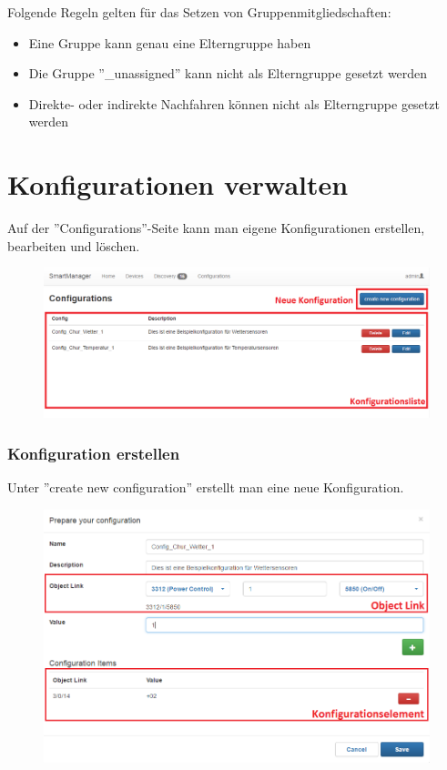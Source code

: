 Folgende Regeln gelten für das Setzen von Gruppenmitgliedschaften:
\begin{itemize}
\item Eine Gruppe kann genau eine Elterngruppe haben
\item Die Gruppe ''\_unassigned'' kann nicht als Elterngruppe gesetzt werden
\item Direkte- oder indirekte Nachfahren können nicht als Elterngruppe gesetzt werden
\end{itemize}

\section{Konfigurationen verwalten}
Auf der ''Configurations''-Seite kann man eigene Konfigurationen erstellen, bearbeiten und löschen.

\begin{figure}[H]
\includegraphics[scale=0.57]{../05_Schlussbericht/images/benutzeranleitung/configurations_overview.png}
\end{figure} 

\subsubsection{Konfiguration erstellen}
Unter ''create new configuration'' erstellt man eine neue Konfiguration.

\begin{figure}[H]
\includegraphics[scale=0.57]{../05_Schlussbericht/images/benutzeranleitung/create_configuration.png}
\end{figure} 

